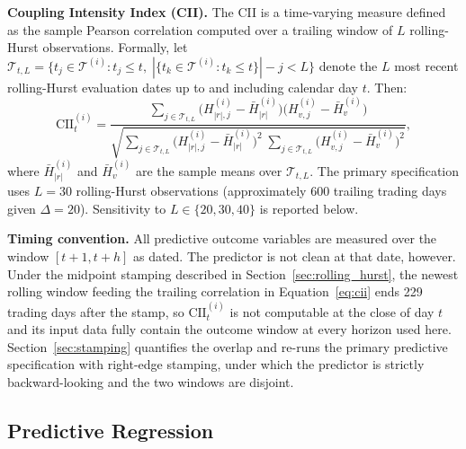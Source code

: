 \documentclass[preprint,12pt,authoryear]{elsarticle}
\begin{document}
\textbf{Coupling Intensity Index (CII).} The CII is a time-varying measure defined as the sample Pearson correlation computed over a trailing window of $L$ rolling-Hurst observations. Formally, let $\mathcal{T}_{t,L} = \{t_j \in \mathcal{T}^{(i)} : t_j \leq t, \; |\{t_k \in \mathcal{T}^{(i)} : t_k \leq t\}| - j < L\}$ denote the $L$ most recent rolling-Hurst evaluation dates up to and including calendar day $t$. Then:
\begin{equation}
\mathrm{CII}^{(i)}_t = \frac{\sum_{j \in \mathcal{T}_{t,L}} \bigl(H^{(i)}_{|r|,j} - \bar{H}^{(i)}_{|r|}\bigr)\bigl(H^{(i)}_{v,j} - \bar{H}^{(i)}_{v}\bigr)}{\sqrt{\sum_{j \in \mathcal{T}_{t,L}} \bigl(H^{(i)}_{|r|,j} - \bar{H}^{(i)}_{|r|}\bigr)^2 \; \sum_{j \in \mathcal{T}_{t,L}} \bigl(H^{(i)}_{v,j} - \bar{H}^{(i)}_{v}\bigr)^2}},
\label{eq:cii}
\end{equation}
where $\bar{H}^{(i)}_{|r|}$ and $\bar{H}^{(i)}_{v}$ are the sample means over $\mathcal{T}_{t,L}$. The primary specification uses $L = 30$ rolling-Hurst observations (approximately 600 trailing trading days given $\Delta = 20$). Sensitivity to $L \in \{20, 30, 40\}$ is reported below.

\textbf{Timing convention.} All predictive outcome variables are measured over the window $[t+1, t+h]$ as dated. The predictor is not clean at that date, however. Under the midpoint stamping described in Section~\ref{sec:rolling_hurst}, the newest rolling window feeding the trailing correlation in Equation~\eqref{eq:cii} ends 229 trading days after the stamp, so $\mathrm{CII}^{(i)}_t$ is not computable at the close of day $t$ and its input data fully contain the outcome window at every horizon used here. Section~\ref{sec:stamping} quantifies the overlap and re-runs the primary predictive specification with right-edge stamping, under which the predictor is strictly backward-looking and the two windows are disjoint.

\subsection{Predictive Regression}
\label{sec:pred_reg}
\end{document}
